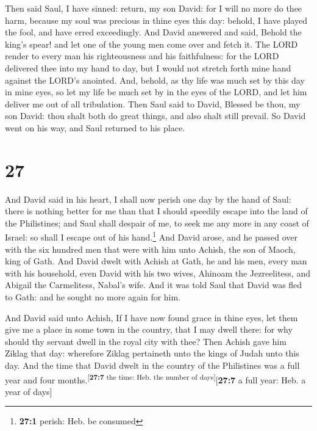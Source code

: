  Then said Saul, I have sinned: return, my son David: for
I will no more do thee harm, because my soul was precious in thine eyes
this day: behold, I have played the fool, and have erred exceedingly.
 And David answered and said, Behold the king's spear!
and let one of the young men come over and fetch it.  The
LORD render to every man his righteousness and his faithfulness: for the
LORD delivered thee into my hand to day, but I would not stretch forth
mine hand against the LORD's anointed.  And, behold, as
thy life was much set by this day in mine eyes, so let my life be much
set by in the eyes of the LORD, and let him deliver me out of all
tribulation.  Then Saul said to David, Blessed be thou,
my son David: thou shalt both do great things, and also shalt still
prevail. So David went on his way, and Saul returned to his place.

\hypertarget{section-26}{%
\section{27}\label{section-26}}

 And David said in his heart, I shall now perish one day
by the hand of Saul: there is nothing better for me than that I should
speedily escape into the land of the Philistines; and Saul shall despair
of me, to seek me any more in any coast of Israel: so shall I escape out
of his hand.\footnote{\textbf{27:1} perish: Heb. be consumed}
 And David arose, and he passed over with the six hundred
men that were with him unto Achish, the son of Maoch, king of Gath.
 And David dwelt with Achish at Gath, he and his men,
every man with his household, even David with his two wives, Ahinoam the
Jezreelitess, and Abigail the Carmelitess, Nabal's wife. 
And it was told Saul that David was fled to Gath: and he sought no more
again for him.

 And David said unto Achish, If I have now found grace in
thine eyes, let them give me a place in some town in the country, that I
may dwell there: for why should thy servant dwell in the royal city with
thee?  Then Achish gave him Ziklag that day: wherefore
Ziklag pertaineth unto the kings of Judah unto this day. 
And the time that David dwelt in the country of the Philistines was a
full year and four months.\textsuperscript{{[}\textbf{27:7} the time:
Heb. the number of days{]}}{[}\textbf{27:7} a full year: Heb. a year of
days{]}

